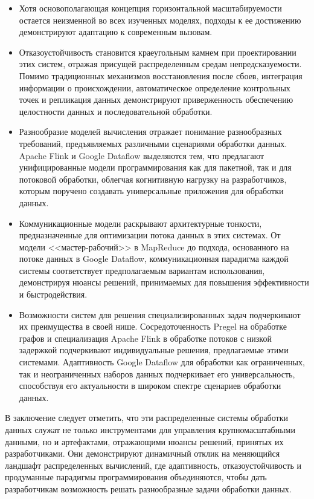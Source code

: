 %
\begin{itemize}
    \item Хотя основополагающая концепция горизонтальной масштабируемости остается неизменной во всех изученных моделях, подходы к ее достижению демонстрируют адаптацию к современным вызовам.

    \item Отказоустойчивость становится краеугольным камнем при проектировании этих систем, отражая присущей распределенным средам непредсказуемости.
        Помимо традиционных механизмов восстановления после сбоев, интеграция информации о происхождении, автоматическое определение контрольных точек и репликация данных демонстрируют приверженность обеспечению целостности данных и последовательной обработки.

    \item Разнообразие моделей вычисления отражает понимание разнообразных требований, предъявляемых различными сценариями обработки данных.
        Apache Flink и Google Dataflow выделяются тем, что предлагают унифицированные модели программирования как для пакетной, так и для потоковой обработки, облегчая когнитивную нагрузку на разработчиков, которым поручено создавать универсальные приложения для обработки данных.

    \item Коммуникационные модели раскрывают архитектурные тонкости, предназначенные для оптимизации потока данных в этих системах.
            От модели <<мастер-рабочий>> в MapReduce до подхода, основанного на потоке данных в Google Dataflow, коммуникационная парадигма каждой системы соответствует предполагаемым вариантам использования, демонстрируя нюансы решений, принимаемых для повышения эффективности и быстродействия.

    \item Возможности систем для решения специализированных задач подчеркивают их преимущества в своей нише. Сосредоточенность Pregel на обработке графов и специализация Apache Flink в обработке потоков с низкой задержкой подчеркивают индивидуальные решения, предлагаемые этими системами.
        Адаптивность Google Dataflow для обработки как ограниченных, так и неограниченных наборов данных подчеркивает его универсальность, способствуя его актуальности в широком спектре сценариев обработки данных.
\end{itemize}
В заключение следует отметить, что эти распределенные системы обработки данных служат не только инструментами для управления крупномасштабными данными, но и артефактами, отражающими нюансы решений, принятых их разработчиками. Они демонстрируют динамичный отклик на меняющийся ландшафт распределенных вычислений, где адаптивность, отказоустойчивость и продуманные парадигмы программирования объединяются, чтобы дать разработчикам возможность решать разнообразные задачи обработки данных.

\clearpage
